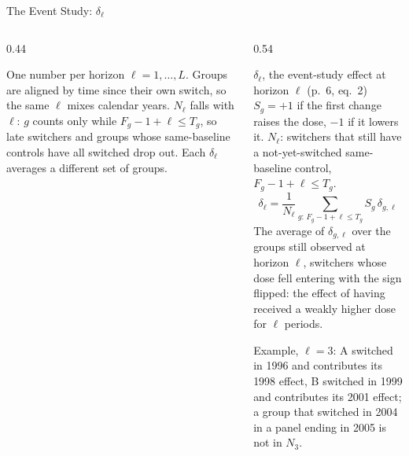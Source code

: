 \documentclass[main.tex]{subfiles}
\begin{document}
\begin{frame}{The Event Study: $\delta_\ell$}

  \begin{columns}[T]
    \begin{column}{0.44\textwidth}

      \footnotesize
      One number per horizon $\ell = 1, \ldots, L$. Groups are aligned by time
      since their own switch, so the same $\ell$ mixes calendar years.
      $N_\ell$ falls with $\ell$: $g$ counts only while
      $F_g-1+\ell \le T_g$, so late switchers and groups whose same-baseline
      controls have all switched drop out. Each $\delta_\ell$ averages a
      different set of groups.
    \end{column}
    \begin{column}{0.54\textwidth}
      \begin{defbox}{$\delta_\ell$, the event-study effect at horizon $\ell$ (p.~6, eq.~2)}
        \footnotesize
        $S_g = +1$ if the first change raises the dose, $-1$ if it lowers it.
        $N_\ell$: switchers that still have a not-yet-switched
        same-baseline control, $F_g - 1 + \ell \le T_g$.
        \[
          \delta_\ell = \frac{1}{N_\ell}\sum_{g:\, F_g-1+\ell \le T_g} S_g\, \delta_{g,\ell}
        \]
        The average of $\delta_{g,\ell}$ over the groups still observed at
        horizon $\ell$, switchers whose dose fell entering with the sign
        flipped: the effect of having received a weakly higher dose for
        $\ell$ periods.
      \end{defbox}

      \smallskip
      \footnotesize Example, $\ell = 3$: A switched in 1996 and contributes
      its 1998 effect, B switched in 1999 and contributes its 2001 effect; a
      group that switched in 2004 in a panel ending in 2005 is not in $N_3$.
    \end{column}
  \end{columns}

\end{frame}
\end{document}

